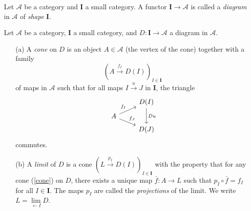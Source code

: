 \begin{definition}
  Let $\mathscr{A}$ be a category and $\mathbf{I}$ a small category. A functor $\mathbf{I}\to \mathscr{A}$ is called a \textit{diagram} in $\mathscr{A}$ of \textit{shape} $\mathbf{I}$.
\end{definition}
\begin{definition}
  Let $\mathscr{A}$ be a category, $\mathbf{I}$ a small category, and $D:\mathbf{I}\to \mathscr{A}$ a diagram in $\mathscr{A}$.
  \begin{enumerate}
    \item [(a)] A \textit{cone} on $D$ is an object $A\in \mathscr{A}$ (the vertex of the cone) together with a family
      \begin{equation}
	\left( A\xrightarrow{f_I}D(I) \right) _{I\in \mathbf{I}}\label{cone}
      \end{equation}
      of maps in $\mathscr{A}$ such that for all maps $I\xrightarrow{u}J$ in $\mathbf{I}$, the triangle
      \[
	\begin{tikzcd}[row sep=tiny]
	& D(I)\arrow[dd, "Du"] \\
	A\arrow[ru,"f_I"]\arrow[rd,"f_J"]  & \\
					   & D(J)
      \end{tikzcd}
      \] commutes.
    \item [(b)] A \textit{limit} of $D$ is a cone $\left( L\xrightarrow{p_I}D(I) \right)_{I\in \mathbf{I}} $ with the property that for any cone (\ref{cone}) on $D$, there exists a unique map $\bar{f}:A\to L$ such that $p_{I}\circ \bar{f}=f_I$ for all $I\in \mathbf{I}$. The maps $p_I$ are called the \textit{projections} of the limit. We write $L=\mathop{\lim}\limits_{\gets I}D$. 
  \end{enumerate}
\end{definition}


